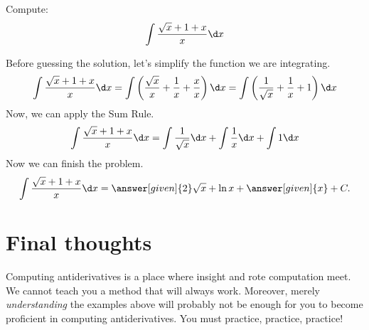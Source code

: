 \documentclass{ximera}
\begin{document}
\begin{example}
Compute:
\[
\int \frac{\sqrt{x}+1+x}{x} \d x
\]
\begin{explanation}
Before guessing the solution, let's simplify the function we are integrating.
\[
\int \frac{\sqrt{x}+1+x}{x} \d x=
\int \left(\frac{\sqrt{x}}{x}+\frac{1}{x}+\frac{x}{x}\right) \d x=\int \left(\frac{1}{\sqrt{x}}+\frac{1}{x}+1\right) \d x
\]
Now, we can apply the Sum Rule.
\[
\int \frac{\sqrt{x}+1+x}{x} \d x=\int \frac{1}{\sqrt{x}}\d x+\int\frac{1}{x}\d x+\int1 \d x
\]
Now we can finish the problem.
\[
\int \frac{\sqrt{x}+1+x}{x} \d x=  \answer[given]{2}\sqrt{x}+\ln{x}+ \answer[given]{x} + C.
\]
\end{explanation}
\end{example}

\section{Final thoughts}
Computing antiderivatives is a place where insight and rote
computation meet. We cannot teach you a method that will always
work. Moreover, merely \emph{understanding} the examples above will
probably not be enough for you to become proficient in computing
antiderivatives. You must practice, practice, practice!
\end{document}
